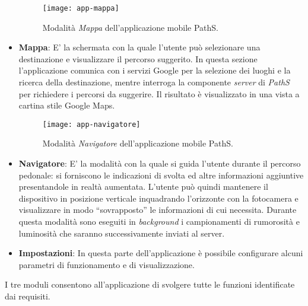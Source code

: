 \begin{itemize}

\begin{figure}[h]
  \centering
  \texttt{[image: app-mappa]}
  \caption{\footnotesize{Modalità \emph{Mappa} dell'applicazione mobile PathS.}}
  \label{fig:app-mappa}
\end{figure}

\item \textbf{Mappa}: E' la schermata con la quale l'utente può selezionare una destinazione e visualizzare il percorso suggerito. In questa sezione l'applicazione comunica con i servizi Google per la selezione dei luoghi e la ricerca della destinazione, mentre interroga la componente \emph{server} di \emph{PathS} per richiedere i percorsi da suggerire. Il risultato è visualizzato in una vista a cartina stile Google Maps.

\begin{figure}[h]
  \centering
  \texttt{[image: app-navigatore]}
  \caption{\footnotesize{Modalità \emph{Navigatore} dell'applicazione mobile PathS.}}
  \label{fig:app-navigatore}
\end{figure}

\item \textbf{Navigatore}: E' la modalità con la quale si guida l'utente durante il percorso pedonale: si forniscono le indicazioni di svolta ed altre informazioni aggiuntive presentandole in realtà aumentata. L'utente può quindi mantenere il dispositivo in posizione verticale inquadrando l'orizzonte con la fotocamera e visualizzare in modo ``sovrapposto'' le informazioni di cui necessita. Durante questa modalità sono eseguiti in \emph{background} i campionamenti di rumorosità e luminosità che saranno successivamente inviati al server.
\item \textbf{Impostazioni}: In questa parte dell'applicazione è possibile configurare alcuni parametri di funzionamento e di visualizzazione.
\end{itemize} 

I tre moduli consentono all'applicazione di svolgere tutte le funzioni identificate dai requisiti.


